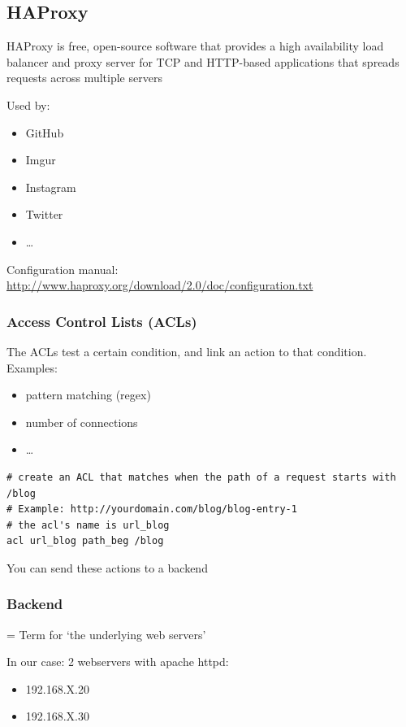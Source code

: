 \documentclass{article}
\begin{document}
\subsection{HAProxy}

HAProxy is free, open-source software that provides a high availability load balancer
and proxy server for TCP and HTTP-based applications that spreads requests across multiple servers

Used by:

\begin{itemize}
    \item GitHub
    \item Imgur
    \item Instagram
    \item Twitter
    \item \dots
\end{itemize}

Configuration manual: \url{http://www.haproxy.org/download/2.0/doc/configuration.txt}

\subsubsection{Access Control Lists (ACLs)}

The ACLs test a certain condition, and link an action to that condition. Examples:

\begin{itemize}
    \item pattern matching (regex)
    \item number of connections
    \item \dots
\end{itemize}

\begin{verbatim}
# create an ACL that matches when the path of a request starts with /blog
# Example: http://yourdomain.com/blog/blog-entry-1
# the acl's name is url_blog
acl url_blog path_beg /blog
\end{verbatim}

You can send these actions to a backend

\subsubsection{Backend}

= Term for `the underlying web servers'

In our case: 2 webservers with apache httpd:

\begin{itemize}
    \item 192.168.X.20
    \item 192.168.X.30
\end{itemize}
\end{document}
